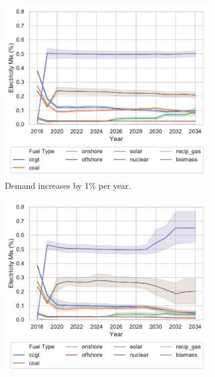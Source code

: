 \begin{figure}
	\centering
	\begin{subfigure}{0.6\textwidth}
		\centering
		\includegraphics[width=\textwidth]{Chapter4/figures/scenarios/representative-day-scenarios/101_demand_mix.pdf}
		\caption{\small Demand increases by 1\% per year.}
		\label{fig:demand101}
	\end{subfigure}
	\hfill
	\begin{subfigure}{0.6\textwidth}  
		\centering 
		\includegraphics[width=\textwidth]{Chapter4/figures/scenarios/representative-day-scenarios/102_demand_mix.pdf}

\end{subfigure}
\end{figure}
